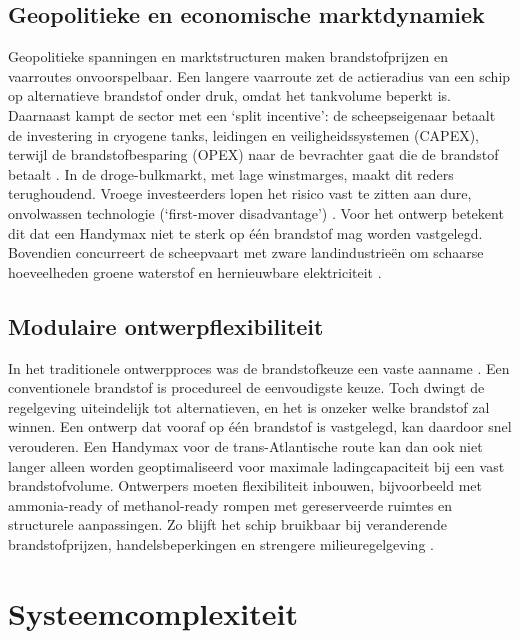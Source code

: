 \documentclass[a4paper]{IMDC2024}
\begin{document}
\subsection{Geopolitieke en economische marktdynamiek}
Geopolitieke spanningen en marktstructuren maken brandstofprijzen en vaarroutes onvoorspelbaar. Een langere vaarroute zet de actieradius van een schip op alternatieve brandstof onder druk, omdat het tankvolume beperkt is. Daarnaast kampt de sector met een `split incentive': de scheepseigenaar betaalt de investering in cryogene tanks, leidingen en veiligheidssystemen (CAPEX), terwijl de brandstofbesparing (OPEX) naar de bevrachter gaat die de brandstof betaalt \citep{vidovic2023}. In de droge-bulkmarkt, met lage winstmarges, maakt dit reders terughoudend. Vroege investeerders lopen het risico vast te zitten aan dure, onvolwassen technologie (`first-mover disadvantage') \citep{AbhilashaFullonton}. Voor het ontwerp betekent dit dat een Handymax niet te sterk op één brandstof mag worden vastgelegd. Bovendien concurreert de scheepvaart met zware landindustrieën om schaarse hoeveelheden groene waterstof en hernieuwbare elektriciteit \citep{vidovic2023}.

\subsection{Modulaire ontwerpflexibiliteit}
In het traditionele ontwerpproces was de brandstofkeuze een vaste aanname \citep{papanikolaou2026}. Een conventionele brandstof is procedureel de eenvoudigste keuze. Toch dwingt de regelgeving uiteindelijk tot alternatieven, en het is onzeker welke brandstof zal winnen. Een ontwerp dat vooraf op één brandstof is vastgelegd, kan daardoor snel verouderen. Een Handymax voor de trans-Atlantische route kan dan ook niet langer alleen worden geoptimaliseerd voor maximale ladingcapaciteit bij een vast brandstofvolume. Ontwerpers moeten flexibiliteit inbouwen, bijvoorbeeld met ammonia-ready of methanol-ready rompen met gereserveerde ruimtes en structurele aanpassingen. Zo blijft het schip bruikbaar bij veranderende brandstofprijzen, handelsbeperkingen en strengere milieuregelgeving \citep{lindstad2022,mckenney2024}.


\section{Systeemcomplexiteit}
\label{sec:systeemcomplexiteit}
\end{document}
